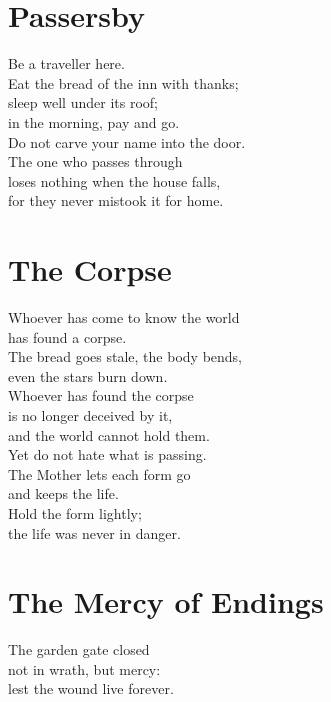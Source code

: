 \documentclass[10pt, openright]{book}
\newcommand{\sectionbreak}{\filbreak}
\newcommand{\sayingsource}[1]{\par\nopagebreak\vspace{0.3\baselineskip}{\raggedleft\footnotesize\itshape #1\par}}
\begin{document}
\sayingsource{Tao Te Ching 20 · John 17:16}

\sectionbreak

\section{Passersby}\label{passersby}

Be a traveller here.\\
Eat the bread of the inn with thanks;\\
sleep well under its roof;\\
in the morning, pay and go.\\
Do not carve your name into the door.\\
The one who passes through\\
loses nothing when the house falls,\\
for they never mistook it for home.

\sayingsource{Thomas 42}

\sectionbreak

\section{The Corpse}\label{the-corpse}

Whoever has come to know the world\\
has found a corpse.\\
The bread goes stale, the body bends,\\
even the stars burn down.\\
Whoever has found the corpse\\
is no longer deceived by it,\\
and the world cannot hold them.\\
Yet do not hate what is passing.\\
The Mother lets each form go\\
and keeps the life.\\
Hold the form lightly;\\
the life was never in danger.

\sayingsource{Thomas 56, 80 · Tao Te Ching 16 · Philip}

\sectionbreak

\section{The Mercy of Endings}\label{the-mercy-of-endings}

The garden gate closed\\
not in wrath, but mercy:\\
lest the wound live forever.
\end{document}
